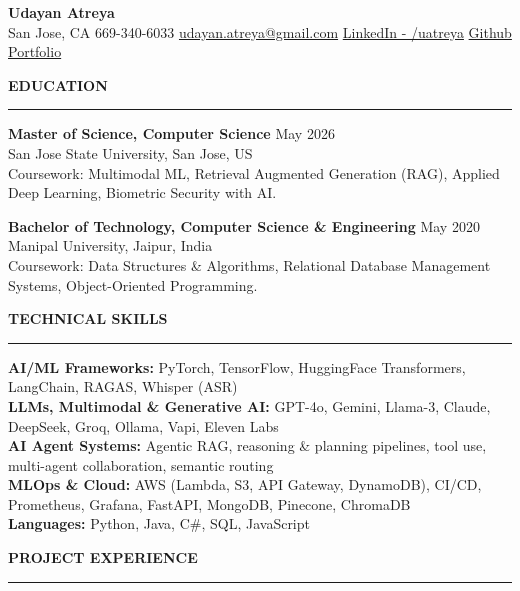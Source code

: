 \documentclass[letterpaper,10.5pt]{extarticle}
\newcommand{\resumesection}[1]{%
    \vspace{6pt}%
    \noindent\textbf{#1}\vspace{-5pt}%
    \\\noindent\rule{\textwidth}{0.5pt}%
    \vspace{1pt}%
}
\begin{document}
\begin{center}
    {\LARGE\textbf{Udayan Atreya}}\\[3pt]
    {\fontsize{11}{13.2}\selectfont
    San Jose, CA \textbar{} 669-340-6033 \textbar{}
    \href{mailto:udayan.atreya@gmail.com}{udayan.atreya@gmail.com} \textbar{}
    \href{https://www.linkedin.com/in/uatreya/}{LinkedIn - /uatreya} \textbar{}
    \href{https://github.com/slowloris-98/}{Github} \textbar{}
    \href{https://udayan-atreya.vercel.app/}{Portfolio}}
\end{center}

\resumesection{EDUCATION}

\noindent\textbf{Master of Science, Computer Science} \hfill May 2026\\
San Jose State University, San Jose, US\\
Coursework: Multimodal ML, Retrieval Augmented Generation (RAG), Applied Deep Learning, Biometric Security with AI.

\vspace{4pt}

\noindent\textbf{Bachelor of Technology, Computer Science \& Engineering} \hfill May 2020\\
Manipal University, Jaipur, India\\
Coursework: Data Structures \& Algorithms, Relational Database Management Systems, Object-Oriented Programming.

\resumesection{TECHNICAL SKILLS}

\noindent\textbf{AI/ML Frameworks:} PyTorch, TensorFlow, HuggingFace Transformers, LangChain, RAGAS, Whisper (ASR)\\
\noindent\textbf{LLMs, Multimodal \& Generative AI:} GPT-4o, Gemini, Llama-3, Claude, DeepSeek, Groq, Ollama, Vapi, Eleven Labs\\
\noindent\textbf{AI Agent Systems:} Agentic RAG, reasoning \& planning pipelines, tool use, multi-agent collaboration, semantic routing\\
\noindent\textbf{MLOps \& Cloud:} AWS (Lambda, S3, API Gateway, DynamoDB), CI/CD, Prometheus, Grafana, FastAPI, MongoDB, Pinecone, ChromaDB\\
\noindent\textbf{Languages:} Python, Java, C\#, SQL, JavaScript

\resumesection{PROJECT EXPERIENCE}
\end{document}
